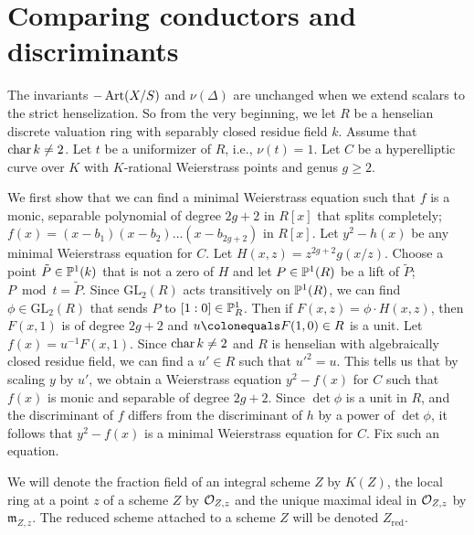 \chapter{Comparing conductors and discriminants}

The invariants $-\Art(X/S)$ and $\nu(\Delta)$ are unchanged when we extend scalars to the strict henselization. So from the very beginning, we let $R$ be a henselian discrete valuation ring with separably closed residue field $k$. Assume that $\cha k \neq 2$. Let $t$ be a uniformizer of $R$, i.e., $\nu(t) = 1$. Let $C$ be a hyperelliptic curve over $K$ with $K$-rational Weierstrass points and genus $g \geq 2$. 

We first show that we can find a minimal Weierstrass equation such that $f$ is a monic, separable polynomial of degree $2g+2$ in $R[x]$ that splits completely; $f(x) = (x-b_1 )(x-b_2 ) \ldots (x-b_{2g+2} )$ in $R[x]$. Let $y^2-h(x)$ be any minimal Weierstrass equation for $C$. Let $H(x,z) = z^{2g+2}g(x/z)$. Choose a point $\tilde{P} \in \P^1(k)$ that is not a zero of $H$ and let $P \in \P^1(R)$ be a lift of $\tilde{P}$; $P \bmod t = \tilde{P}$. Since $\mathrm{GL}_2(R)$ acts transitively on $\P^1(R)$, we can find $\phi \in \mathrm{GL}_2(R)$ that sends $P$ to $[1:0] \in \P^1_R$. Then if $F(x,z) = \phi \cdot H(x,z)$, then $F(x,1)$ is of degree $2g+2$ and $u \colonequals F(1,0) \in R$ is a unit. Let $f(x) = u^{-1}F(x,1)$. Since $\cha k \neq 2$ and $R$ is henselian with algebraically closed residue field, we can find a $u' \in R$ such that $u'^2 = u$. This tells us that by scaling $y$ by $u'$, we obtain a Weierstrass equation $y^2-f(x)$ for $C$ such that $f(x)$ is monic and separable of degree $2g+2$. Since $\det \phi$ is a unit in $R$, and the discriminant of $f$ differs from the discriminant of $h$ by a power of $\det \phi$, it follows that $y^2-f(x)$ is a minimal Weierstrass equation for $C$. Fix such an equation. 

We will denote the fraction field of an integral scheme $Z$ by $K(Z)$, the local ring at a point $z$ of a scheme $Z$ by $\O_{Z,z}$ and the unique maximal ideal in $\O_{Z,z}$ by $\mathfrak{m}_{Z,z}$. The reduced scheme attached to a scheme $Z$ will be denoted $Z_{\mathrm{red}}$.

